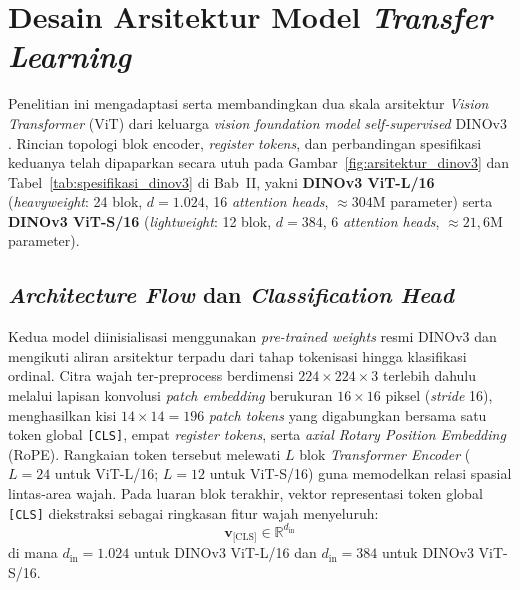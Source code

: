 \section{Desain Arsitektur Model \textit{Transfer Learning}}
\label{sec:perancangan_arsitektur}

Penelitian ini mengadaptasi serta membandingkan dua skala arsitektur \textit{Vision Transformer} (ViT) dari keluarga \textit{vision foundation model} \textit{self-supervised} DINOv3 \cite{simeoni2025dinov3}. Rincian topologi blok encoder, \textit{register tokens}, dan perbandingan spesifikasi keduanya telah dipaparkan secara utuh pada Gambar~\ref{fig:arsitektur_dinov3} dan Tabel~\ref{tab:spesifikasi_dinov3} di Bab~II, yakni \textbf{DINOv3 ViT-L/16} (\textit{heavyweight}: 24 blok, $d=1.024$, 16 \textit{attention heads}, $\approx 304\text{M}$ parameter) serta \textbf{DINOv3 ViT-S/16} (\textit{lightweight}: 12 blok, $d=384$, 6 \textit{attention heads}, $\approx 21,6\text{M}$ parameter).

\subsection{\textit{Architecture Flow} dan \textit{Classification Head}}
Kedua model diinisialisasi menggunakan \textit{pre-trained weights} resmi DINOv3 \cite{simeoni2025dinov3} dan mengikuti aliran arsitektur terpadu dari tahap tokenisasi hingga klasifikasi ordinal. Citra wajah ter-preprocess berdimensi $224 \times 224 \times 3$ terlebih dahulu melalui lapisan konvolusi \textit{patch embedding} berukuran $16 \times 16$ piksel (\textit{stride} 16), menghasilkan kisi $14 \times 14 = 196$ \textit{patch tokens} yang digabungkan bersama satu token global \texttt{[CLS]}, empat \textit{register tokens}, serta \textit{axial Rotary Position Embedding} (RoPE). Rangkaian token tersebut melewati $L$ blok \textit{Transformer Encoder} ($L=24$ untuk ViT-L/16; $L=12$ untuk ViT-S/16) guna memodelkan relasi spasial lintas-area wajah. Pada luaran blok terakhir, vektor representasi token global \texttt{[CLS]} diekstraksi sebagai ringkasan fitur wajah menyeluruh:
\begin{equation}
    \mathbf{v}_{\text{[CLS]}} \in \mathbb{R}^{d_{\text{in}}}
\end{equation}
di mana $d_{\text{in}} = 1.024$ untuk DINOv3 ViT-L/16 dan $d_{\text{in}} = 384$ untuk DINOv3 ViT-S/16.

